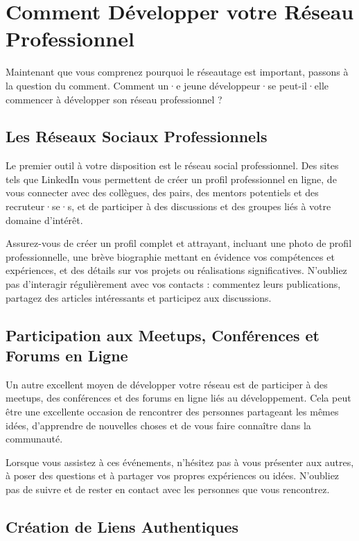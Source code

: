 \section{Comment Développer votre Réseau Professionnel}

Maintenant que vous comprenez pourquoi le réseautage est important, passons à la question du comment. Comment un·e jeune développeur·se peut-il·elle commencer à développer son réseau professionnel ?

\subsection{Les Réseaux Sociaux Professionnels}

Le premier outil à votre disposition est le réseau social professionnel. Des sites tels que LinkedIn vous permettent de créer un profil professionnel en ligne, de vous connecter avec des collègues, des pairs, des mentors potentiels et des recruteur·se·s, et de participer à des discussions et des groupes liés à votre domaine d'intérêt.

Assurez-vous de créer un profil complet et attrayant, incluant une photo de profil professionnelle, une brève biographie mettant en évidence vos compétences et expériences, et des détails sur vos projets ou réalisations significatives. N'oubliez pas d'interagir régulièrement avec vos contacts : commentez leurs publications, partagez des articles intéressants et participez aux discussions.

\subsection{Participation aux Meetups, Conférences et Forums en Ligne}

Un autre excellent moyen de développer votre réseau est de participer à des meetups, des conférences et des forums en ligne liés au développement. Cela peut être une excellente occasion de rencontrer des personnes partageant les mêmes idées, d'apprendre de nouvelles choses et de vous faire connaître dans la communauté.

Lorsque vous assistez à ces événements, n'hésitez pas à vous présenter aux autres, à poser des questions et à partager vos propres expériences ou idées. N'oubliez pas de suivre et de rester en contact avec les personnes que vous rencontrez.

\subsection{Création de Liens Authentiques}

